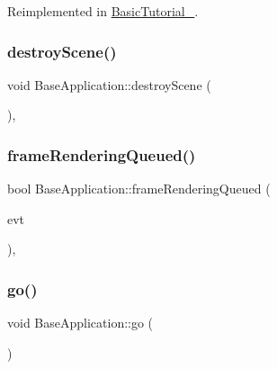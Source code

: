 Reimplemented in \mbox{\hyperlink{class_basic_tutorial__00_adc2454d9f8226e0958ecf702f355846e}{Basic\+Tutorial\+\_}}.

\mbox{\label{class_base_application_a365146059b25391fe400f5fdb94f011e}} 
\subsubsection{\texorpdfstring{destroy\+Scene()}{destroyScene()}}
{\footnotesize\ttfamily void Base\+Application\+::destroy\+Scene (\begin{DoxyParamCaption}\item[{void}]{ }\end{DoxyParamCaption})\hspace{0.3cm}{\ttfamily [protected]}, {\ttfamily [virtual]}}

\mbox{\label{class_base_application_a03912a0f38b38fede7f08a2571e8fc56}} 
\subsubsection{\texorpdfstring{frame\+Rendering\+Queued()}{frameRenderingQueued()}}
{\footnotesize\ttfamily bool Base\+Application\+::frame\+Rendering\+Queued (\begin{DoxyParamCaption}\item[{const Ogre\+::\+Frame\+Event \&}]{evt }\end{DoxyParamCaption})\hspace{0.3cm}{\ttfamily [protected]}, {\ttfamily [virtual]}}

\mbox{\label{class_base_application_a8a14a65a29118dd75173aa68678a05e1}} 
\subsubsection{\texorpdfstring{go()}{go()}}
{\footnotesize\ttfamily void Base\+Application\+::go (\begin{DoxyParamCaption}\item[{void}]{ }\end{DoxyParamCaption})\hspace{0.3cm}{\ttfamily [virtual]}}

